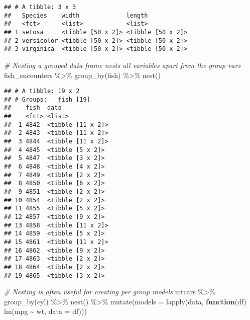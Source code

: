 \documentclass[
]{book}
\newenvironment{Shaded}{\begin{snugshade}}{\end{snugshade}}
\newcommand{\AttributeTok}[1]{\textcolor[rgb]{0.77,0.63,0.00}{#1}}
\newcommand{\CommentTok}[1]{\textcolor[rgb]{0.56,0.35,0.01}{\textit{#1}}}
\newcommand{\ControlFlowTok}[1]{\textcolor[rgb]{0.13,0.29,0.53}{\textbf{#1}}}
\newcommand{\FunctionTok}[1]{\textcolor[rgb]{0.00,0.00,0.00}{#1}}
\newcommand{\NormalTok}[1]{#1}
\newcommand{\SpecialCharTok}[1]{\textcolor[rgb]{0.00,0.00,0.00}{#1}}
\begin{document}
\begin{verbatim}
## # A tibble: 3 x 3
##   Species    width             length           
##   <fct>      <list>            <list>           
## 1 setosa     <tibble [50 x 2]> <tibble [50 x 2]>
## 2 versicolor <tibble [50 x 2]> <tibble [50 x 2]>
## 3 virginica  <tibble [50 x 2]> <tibble [50 x 2]>
\end{verbatim}

\begin{Shaded}
\begin{Highlighting}[]
\CommentTok{\# Nesting a grouped data frame nests all variables apart from the group vars}
\NormalTok{fish\_encounters }\SpecialCharTok{\%\textgreater{}\%}
  \FunctionTok{group\_by}\NormalTok{(fish) }\SpecialCharTok{\%\textgreater{}\%}
  \FunctionTok{nest}\NormalTok{()}
\end{Highlighting}
\end{Shaded}

\begin{verbatim}
## # A tibble: 19 x 2
## # Groups:   fish [19]
##    fish  data             
##    <fct> <list>           
##  1 4842  <tibble [11 x 2]>
##  2 4843  <tibble [11 x 2]>
##  3 4844  <tibble [11 x 2]>
##  4 4845  <tibble [5 x 2]> 
##  5 4847  <tibble [3 x 2]> 
##  6 4848  <tibble [4 x 2]> 
##  7 4849  <tibble [2 x 2]> 
##  8 4850  <tibble [6 x 2]> 
##  9 4851  <tibble [2 x 2]> 
## 10 4854  <tibble [2 x 2]> 
## 11 4855  <tibble [5 x 2]> 
## 12 4857  <tibble [9 x 2]> 
## 13 4858  <tibble [11 x 2]>
## 14 4859  <tibble [5 x 2]> 
## 15 4861  <tibble [11 x 2]>
## 16 4862  <tibble [9 x 2]> 
## 17 4863  <tibble [2 x 2]> 
## 18 4864  <tibble [2 x 2]> 
## 19 4865  <tibble [3 x 2]>
\end{verbatim}

\begin{Shaded}
\begin{Highlighting}[]
\CommentTok{\# Nesting is often useful for creating per group models}
\NormalTok{mtcars }\SpecialCharTok{\%\textgreater{}\%}
  \FunctionTok{group\_by}\NormalTok{(cyl) }\SpecialCharTok{\%\textgreater{}\%}
  \FunctionTok{nest}\NormalTok{() }\SpecialCharTok{\%\textgreater{}\%}
  \FunctionTok{mutate}\NormalTok{(}\AttributeTok{models =} \FunctionTok{lapply}\NormalTok{(data, }\ControlFlowTok{function}\NormalTok{(df) }\FunctionTok{lm}\NormalTok{(mpg }\SpecialCharTok{\textasciitilde{}}\NormalTok{ wt, }\AttributeTok{data =}\NormalTok{ df)))}
\end{Highlighting}
\end{Shaded}
\end{document}
